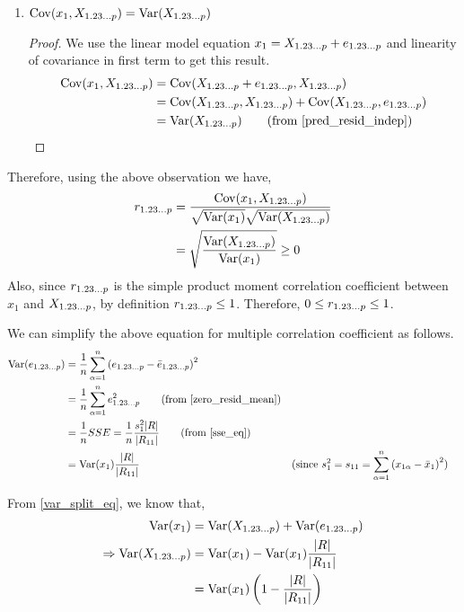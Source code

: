 \documentclass[10pt]{article}
\begin{document}
\begin{enumerate}[1.]
	\item \( \operatorname{Cov}(x_{1}, X_{1.23\dots p}) = \operatorname{Var}(X_{1.23\dots p}) \)
	\begin{proof}
	    We use the linear model equation \( x_{1} = X_{1.23\dots p} + e_{1.23\dots p} \) and linearity of covariance in first term to get this result.
	    \begin{align*}
		    \Cov(x_{1}, X_{\regsub}) &= \Cov(X_{\regsub} + e_{\regsub}, X_{\regsub}) \\
							  &= \Cov(X_{\regsub}, X_{\regsub}) + \Cov(X_{\regsub}, e_{\regsub}) \\
							  &= \Var(X_{\regsub}) \tag*{(from \eqref{pred_resid_indep})}
	    \end{align*}
	\end{proof}
\end{enumerate}

Therefore, using the above observation we have,
\begin{align}
	r_{1.23\dots p} &= \frac{\operatorname{Cov}(x_{1}, X_{1.23\dots p})}{\sqrt{\operatorname{Var}(x_{1})} \sqrt{\operatorname{Var}(X_{1.23\dots p})}} \notag \\
		    &= \sqrt{\frac{\operatorname{Var}(X_{1.23\dots p})}{\operatorname{Var}(x_{1})}} \geq 0 \label{mul_cor1}
\end{align}
Also, since \( r_{1.23\dots p} \) is the simple product moment correlation coefficient between \( x_{1} \) and \( X_{1.23\dots p} \), by definition \( r_{1.23\dots p} \leq 1 \). Therefore, \( 0 \leq r_{1.23\dots p} \leq 1 \).

We can simplify the above equation for multiple correlation coefficient as follows.
\begin{align}
	\Var(e_{\regsub}) &= \frac{1}{n}\sum_{\alpha=1}^{n} \left( e_{\regsub} - \bar{e}_{\regsub} \right) ^{2} \notag \\
			  &= \frac{1}{n} \sum_{\alpha=1}^{n} e_{\regsub}^{2} \tag*{(from \eqref{zero_resid_mean})} \\
			  &= \frac{1}{n} SSE = \frac{1}{n} \frac{s _{1}^{2} \lvert R \rvert }{\lvert R_{11} \rvert} \tag*{(from \eqref{sse_eq})} \\
			  &= \Var(x_{1}) \frac{\lvert R \rvert}{\lvert R_{11} \rvert} && \text{(since \( s _{1}^{2} = s _{11} = \sum_{\alpha=1}^{n} \left( x_{1\alpha} - \bar{x}_{1} \right) ^{2} \))} \label{var_sse_rel}
\end{align}

From \eqref{var_split_eq}, we know that, 
\begin{align*}
	\operatorname{Var}(x_{1}) &= \operatorname{Var}(X_{1.23\dots p}) + \operatorname{Var}(e_{1.23\dots p}) \\
	\Rightarrow \operatorname{Var}(X_{1.23\dots p}) &= \operatorname{Var}(x_{1}) - \operatorname{Var}(x_{1})\frac{\lvert R \rvert }{\lvert R_{11} \rvert } \\
			  &= \operatorname{Var}(x_{1})\left( 1 - \frac{\lvert R \rvert }{\lvert R_{11} \rvert } \right) 
\end{align*}
\end{document}
